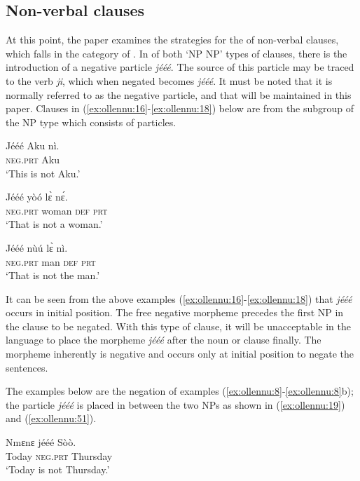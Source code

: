 \documentclass[output=paper,newtxmath,modfonts,nonflat,draftmode]{langsci/langscibook}
\begin{document}
\subsection{\label{sec:ollennu:2.1} Non-verbal clauses}

At this point, the paper examines the strategies for the  of non-verbal clauses, which falls in the category of . In  of both ‘NP NP’ types of clauses, there is the introduction of a {negative particle} \textit{jééé}. The source of this particle may be traced to the  verb \textit{ji}, which when negated becomes \textit{jééé}. It must be noted that it is normally referred to as the {negative particle}, and that will be maintained in this paper. Clauses in (\ref{ex:ollennu:16}-\ref{ex:ollennu:18}) below are from the subgroup of the NP type which consists of particles.

\ea \label{ex:ollennu:16}
\gll Jééé Aku nì.\\
\textsc{neg}.\textsc{prt} Aku\\
\glt `This is not Aku.'
\z

\ea \label{ex:ollennu:17}
\gll Jééé yòó l\`ɛ n\'ɛ.\\
\textsc{neg}.\textsc{prt} woman \textsc{def} \textsc{prt}\\
\glt `That is not a woman.'
\z

\ea \label{ex:ollennu:18}
\gll Jééé nù\'u l\`ɛ nì.\\
\textsc{neg}.\textsc{prt} man \textsc{def} \textsc{prt}\\
\glt ‘That is not the man.’
\z

It can be seen from the above examples (\ref{ex:ollennu:16}-\ref{ex:ollennu:18}) that \textit{jééé} occurs in initial position. The free negative morpheme precedes the first NP in the clause to be negated. With this type of clause, it will be unacceptable in the  language to place the morpheme \textit{jééé} after the noun or clause finally. The morpheme inherently is negative and occurs only at initial position to negate the sentences. 

The examples below are the negation of examples (\ref{ex:ollennu:8}-\ref{ex:ollennu:8}b); the particle \textit{jééé} is placed in between the two NPs as shown in (\ref{ex:ollennu:19}) and (\ref{ex:ollennu:51}).

\ea \label{ex:ollennu:19}
\gll Nmɛnɛ jééé Sòò.\\
Today \textsc{neg}.\textsc{prt} Thursday\\
\glt `Today is not Thursday.'
\z
\end{document}
